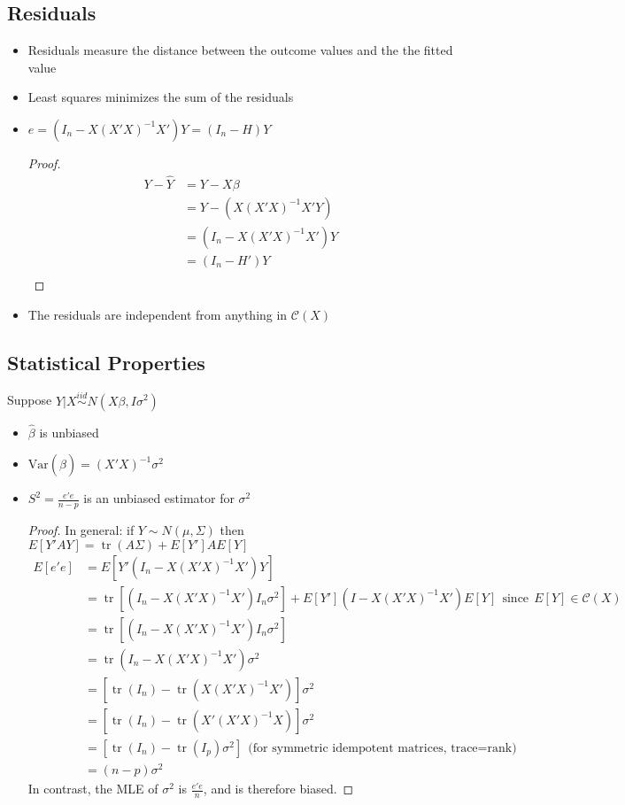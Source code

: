 \documentclass[12pt]{article}\usepackage{graphicx, color}
\theoremstyle{definition}
\newcommand{\Var}{\mathrm{Var}}
\renewcommand{\hat}{\widehat}
\DeclareMathOperator{\tr}{tr}
\begin{document}
\subsection{Residuals}
\begin{itemize}
\item Residuals measure the distance between the outcome values and the the fitted value
\item Least squares minimizes the sum of the residuals
\item $e=(I_n-X(X'X)^{-1}X')Y=(I_n-H)Y$
\begin{proof}
\begin{align*}Y-\hat Y &= Y - X\beta\\
&=Y-(X(X'X)^{-1}X'Y)\\
&=(I_n-X(X'X)^{-1}X')Y\\
&=(I_n-H')Y\\
\end{align*}
\end{proof}
\item The residuals are independent from anything in $\mathcal{C}(X)$
\end{itemize}
\subsection{Statistical Properties}
Suppose $Y|X \stackrel{iid}{\sim} N(X \beta, I \sigma^2)$
\begin{itemize}
\item $\hat \beta$ is unbiased
\item $\Var(\hat \beta)=(X'X)^{-1} \sigma^2$
\item $S^2=\frac{e'e}{n-p}$ is an unbiased estimator for $\sigma^2$
\begin{proof}
In general: if $Y\sim N(\mu, \Sigma)$ then $E[Y'AY]=\tr(A\Sigma)+E[Y']AE[Y]$
\begin{align*}E[e'e]&=E[Y'(I_n-X(X'X)^{-1}X')Y]\\
&=\tr[(I_n-X(X'X)^{-1}X')I_n\sigma^2]+E[Y'](I-X(X'X)^{-1}X')E[Y]~~\text{since}~~E[Y]\in \mathcal{C}(X)\\
&=\tr[(I_n-X(X'X)^{-1}X')I_n\sigma^2]\\
&=\tr(I_n-X(X'X)^{-1}X')\sigma^2\\
&=[\tr(I_n)-\tr(X(X'X)^{-1}X')]\sigma^2\\
&=[\tr(I_n)-\tr(X'(X'X)^{-1}X)]\sigma^2\\
&=[\tr(I_n)-\tr(I_p)\sigma^2]~~\text{(for symmetric idempotent matrices, trace=rank)}\\
&=(n-p)\sigma^2
\end{align*}
In contrast, the MLE of $\sigma^2$ is $\frac{e'e}{n}$, and is therefore biased.
\end{proof}
\end{itemize}
\end{document}

